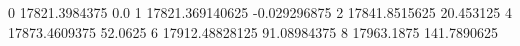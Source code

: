 0 17821.3984375 0.0
1 17821.369140625 -0.029296875
2 17841.8515625 20.453125
4 17873.4609375 52.0625
6 17912.48828125 91.08984375
8 17963.1875 141.7890625

